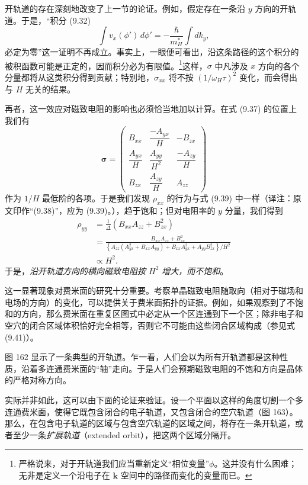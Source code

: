 
开轨道的存在深刻地改变了上一节的论证。例如，假定存在一条沿 $y$ 方向的开轨道。于是，“积分 (9.32)
\begin{equation*}
\int v_{x}(\phi')\,d\phi'=-\frac{\hbar}{m_H^{*}}\int dk_{y}, \tag{9.42}
\end{equation*}
必定为零”这一证明不再成立。事实上，一眼便可看出，沿这条路径的这个积分的被积函数可能是正定的，因而积分必为有限值。\footnote{严格说来，对于开轨道我们应当重新定义“相位变量”$\phi$。这并没有什么困难；无非是定义一个沿电子在 $\mathbf{k}$ 空间中的路径而变化的变量而已。}这样，$\sigma$ 中凡涉及 $x$ 方向的各个分量都将从这类积分得到贡献；特别地，$\sigma_{xx}$ 将不按 $(1/\omega_H\tau)^{2}$ 变化，而会得出与 $H$ 无关的结果。

再者，这一效应对磁致电阻的影响也必须恰当地加以计算。在式 (9.37) 的位置上我们有
\begin{equation*}
\boldsymbol{\sigma}=\begin{pmatrix}
B_{xx} & \dfrac{-A_{yx}}{H} & -B_{zx}\\[10pt]
\dfrac{A_{yx}}{H} & \dfrac{A_{yy}}{H^{2}} & \dfrac{-A_{zy}}{H}\\[10pt]
B_{zx} & \dfrac{A_{zy}}{H} & A_{zz}
\end{pmatrix} \tag{9.43}
\end{equation*}
作为 $1/H$ 最低阶的各项。于是我们发现 $\rho_{xx}$ 的行为与式 (9.39) 中一样（译注：原文印作“(9.38)”，应为 (9.39)。），趋于饱和；但对电阻率的 $y$ 分量，我们得到
\begin{align*}
\rho_{yy}&=\frac{1}{\Delta}\left(B_{xx}A_{zz}+B_{zx}^{2}\right)\\
&=\frac{B_{xx}A_{zz}+B_{zx}^{2}}{\left\{A_{zz}(A_{yx}^{2}+B_{xx}A_{yy})+B_{xx}A_{yx}^{2}+A_{yy}B_{zx}^{2}\right\}/H^{2}}\\
&\propto H^{2}. \tag{9.44}
\end{align*}
于是，\emph{沿开轨道方向的横向磁致电阻按 $H^{2}$ 增大，而不饱和}。

这一显著现象对费米面的研究十分重要。考察单晶磁致电阻随取向（相对于磁场和电场的方向）的变化，可以提供关于费米面拓扑的证据。例如，如果观察到了不饱和的方向，那么费米面在重复区图式中必定从一个区连通到下一个区；除非电子和空穴的闭合区域体积恰好完全相等，否则它不可能由这些闭合区域构成（参见式 (9.41)）。

图 162 显示了一条典型的开轨道。乍一看，人们会以为所有开轨道都是这种性质，沿着多连通费米面的“轴”走向。于是人们会预期磁致电阻的不饱和方向是晶体的严格对称方向。

实际并非如此，这可以由下面的论证来验证。设一个平面以这样的角度切割一个多连通费米面，使得它既包含闭合的电子轨道，又包含闭合的空穴轨道（图 163）。那么，在包含电子轨道的区域与包含空穴轨道的区域之间，将存在一条开轨道，或者至少一条\emph{扩展轨道}（extended orbit），把这两个区域分隔开。

